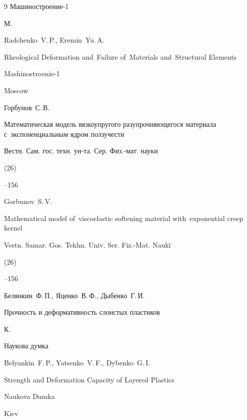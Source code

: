 \begin{thebibliography}{9}
\publ Машиностроение-1

\publaddr М.


\misctransl

\by Radchenko~V.\,P., Eremin~Yu.\,A.

\book Rheological Deformation and~Failure of~Materials and~Structural Elements


\publ Mashinostroenie-1

\publaddr Moscow







\by Горбунов~С.\,В.

\paper Математическая модель вязкоупругого разупрочняющегося материала с~экспоненциальным ядром ползучести

\jour Вестн. Сам. гос. техн. ун-та. Сер. Физ.-мат. науки


(26)

--156


\misctransl

\by Gorbunov~S.\,V.

\paper Mathematical model of~viscoelastic softening material with~exponential creep kernel

\jour Vestn. Samar. Gos. Tekhn. Univ. Ser. Fiz.-Mat. Nauki


(26)

--156




\by Белянкин~Ф.\,П., Яценко~В.\,Ф., Дыбенко~Г.\,И.

\book Прочность и деформативность слоистых пластиков

\publaddr К.

\publ Наукова думка



\misctransl

\by  Belyankin~F.\,P., Yatsenko~V.\,F., Dybenko~G.\,I.

\book Strength and Deformation Capacity of Layered Plastics

\publ Naukova Dumka

\publaddr Kiev





\end{thebibliography}



